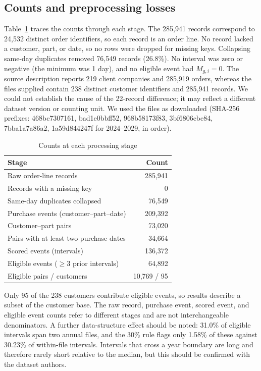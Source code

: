 \documentclass[conference]{IEEEtran}
\begin{document}
\subsection{Counts and preprocessing losses}
Table~\ref{tab:dataset} traces the counts through each stage. The 285,941 records correspond to 24,532 distinct order identifiers, so each record is an order line. No record lacked a customer, part, or date, so no rows were dropped for missing keys. Collapsing same-day duplicates removed 76,549 records (26.8\%). No interval was zero or negative (the minimum was 1 day), and no eligible event had $M_{g,i}=0$. The source description reports 219 client companies and 285,919 orders, whereas the files supplied contain 238 distinct customer identifiers and 285,941 records. We could not establish the cause of the 22-record difference; it may reflect a different dataset version or counting unit. We used the files as downloaded (SHA-256 prefixes: 468bc7307161, bad1e0bbff52, 968b58173f83, 3bf6806cbe84, 7bba1a7a86a2, 1a59d844247f for 2024--2029, in order).

\begin{table}[t]
\caption{Counts at each processing stage}
\label{tab:dataset}
\centering
\footnotesize
\begin{tabular}{lr}
\toprule
\textbf{Stage} & \textbf{Count}\\
\midrule
Raw order-line records & 285,941\\
Records with a missing key & 0\\
Same-day duplicates collapsed & 76,549\\
Purchase events (customer--part--date) & 209,392\\
Customer--part pairs & 73,020\\
Pairs with at least two purchase dates & 34,664\\
Scored events (intervals) & 136,372\\
Eligible events ($\geq$3 prior intervals) & 64,892\\
Eligible pairs / customers & 10,769 / 95\\
\bottomrule
\end{tabular}
\end{table}

Only 95 of the 238 customers contribute eligible events, so results describe a subset of the customer base. The raw record, purchase event, scored event, and eligible event counts refer to different stages and are not interchangeable denominators. A further data-structure effect should be noted: 31.0\% of eligible intervals span two annual files, and the 30\% rule flags only 1.58\% of these against 30.23\% of within-file intervals. Intervals that cross a year boundary are long and therefore rarely short relative to the median, but this should be confirmed with the dataset authors.
\end{document}
